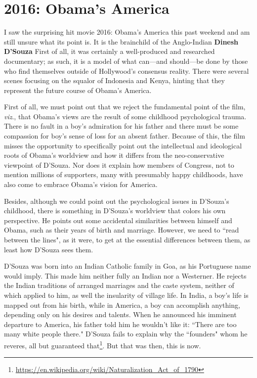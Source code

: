 \section{2016: Obama's America}

I saw the surprising hit movie 2016: Obama's America this past weekend and am still unsure what its point is. It is the brainchild of the Anglo-Indian \textbf{Dinesh D'Souza} First of all, it was certainly a well-produced and researched documentary; as such, it is a model of what can—and should—be done by those who find themselves outside of Hollywood's consensus reality. There were several scenes focusing on the squalor of Indonesia and Kenya, hinting that they represent the future course of Obama's America.

First of all, we must point out that we reject the fundamental point of the film, \emph{viz}., that Obama's views are the result of some childhood psychological trauma. There is no fault in a boy's admiration for his father and there must be some compassion for boy's sense of loss for an absent father. Because of this, the film misses the opportunity to specifically point out the intellectual and ideological roots of Obama's worldview and how it differs from the neo-conservative viewpoint of D'Souza. Nor does it explain how members of Congress, not to mention millions of supporters, many with presumably happy childhoods, have also come to embrace Obama's vision for America.

Besides, although we could point out the psychological issues in D'Souza's childhood, there is something in D'Souza's worldview that colors his own perspective. He points out some accidental similarities between himself and Obama, such as their years of birth and marriage. However, we need to ``read between the lines", as it were, to get at the essential differences between them, as least how D'Souza sees them.

D'Souza was born into an Indian Catholic family in Goa, as his Portuguese name would imply. This made him neither fully an Indian nor a Westerner. He rejects the Indian traditions of arranged marriages and the caste system, neither of which applied to him, as well the insularity of village life. In India, a boy's life is mapped out from his birth, while in America, a boy can accomplish anything, depending only on his desires and talents. When he announced his imminent departure to America, his father told him he wouldn't like it: ``There are too many white people there." D'Souza fails to explain why the ``founders" whom he reveres, all but guaranteed that\footnote{\url{https://en.wikipedia.org/wiki/Naturalization_Act_of_1790}}. But that was then, this is now.


